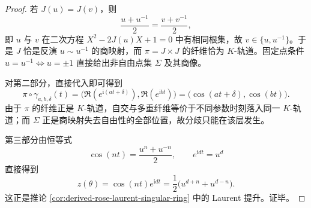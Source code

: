 \begin{proof}
若 \(J(u)=J(v)\)，则
\[
\frac{u+u^{-1}}{2}=\frac{v+v^{-1}}{2},
\]
即 \(u\) 与 \(v\) 在二次方程 \(X^2-2J(u)X+1=0\) 中有相同根集，故 \(v\in\{u,u^{-1}\}\)。于是 \(J\) 恰是反演 \(u\sim u^{-1}\) 的商映射，而 \(\pi=J\times J\) 的纤维恰为 \(K\)-轨道。固定点条件 \(u=u^{-1}\iff u=\pm1\) 直接给出非自由点集 \(\Sigma\) 及其商像。

对第二部分，直接代入即可得到
\[
\pi\circ\gamma_{a,b,\delta}(t)
=\bigl(\Re(e^{\mathrm i(at+\delta)}),\Re(e^{\mathrm i bt})\bigr)
=\bigl(\cos(at+\delta),\cos(bt)\bigr).
\]
由于 \(\pi\) 的纤维正是 \(K\)-轨道，自交与多重纤维等价于不同参数时刻落入同一 \(K\)-轨道；而 \(\Sigma\) 正是商映射失去自由性的全部位置，故分歧只能在该层发生。

第三部分由恒等式
\[
\cos(nt)=\frac{u^n+u^{-n}}{2},
\qquad
e^{\mathrm i d t}=u^d
\]
直接得到
\[
z(\theta)=\cos(nt)e^{\mathrm i d t}
=\frac12\bigl(u^{d+n}+u^{d-n}\bigr).
\]
这正是推论 \ref{cor:derived-rose-laurent-singular-ring} 中的 Laurent 提升。证毕。
\end{proof}

